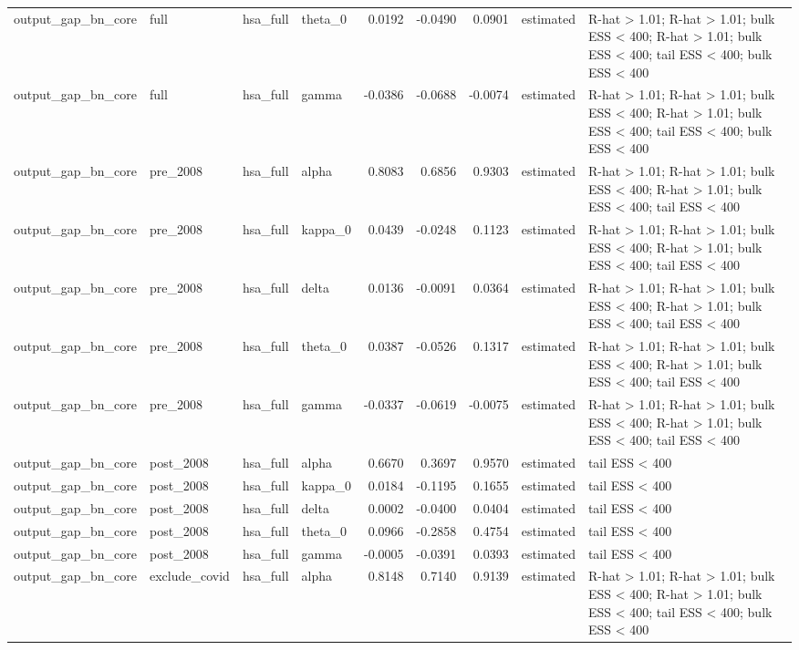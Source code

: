\begin{tabular}{llllrrrll}
output\_gap\_bn\_core & full & hsa\_full & theta\_0 & 0.0192 & -0.0490 & 0.0901 & estimated & R-hat > 1.01; R-hat > 1.01; bulk ESS < 400; R-hat > 1.01; bulk ESS < 400; tail ESS < 400; bulk ESS < 400 \\
output\_gap\_bn\_core & full & hsa\_full & gamma & -0.0386 & -0.0688 & -0.0074 & estimated & R-hat > 1.01; R-hat > 1.01; bulk ESS < 400; R-hat > 1.01; bulk ESS < 400; tail ESS < 400; bulk ESS < 400 \\
output\_gap\_bn\_core & pre\_2008 & hsa\_full & alpha & 0.8083 & 0.6856 & 0.9303 & estimated & R-hat > 1.01; R-hat > 1.01; bulk ESS < 400; R-hat > 1.01; bulk ESS < 400; tail ESS < 400 \\
output\_gap\_bn\_core & pre\_2008 & hsa\_full & kappa\_0 & 0.0439 & -0.0248 & 0.1123 & estimated & R-hat > 1.01; R-hat > 1.01; bulk ESS < 400; R-hat > 1.01; bulk ESS < 400; tail ESS < 400 \\
output\_gap\_bn\_core & pre\_2008 & hsa\_full & delta & 0.0136 & -0.0091 & 0.0364 & estimated & R-hat > 1.01; R-hat > 1.01; bulk ESS < 400; R-hat > 1.01; bulk ESS < 400; tail ESS < 400 \\
output\_gap\_bn\_core & pre\_2008 & hsa\_full & theta\_0 & 0.0387 & -0.0526 & 0.1317 & estimated & R-hat > 1.01; R-hat > 1.01; bulk ESS < 400; R-hat > 1.01; bulk ESS < 400; tail ESS < 400 \\
output\_gap\_bn\_core & pre\_2008 & hsa\_full & gamma & -0.0337 & -0.0619 & -0.0075 & estimated & R-hat > 1.01; R-hat > 1.01; bulk ESS < 400; R-hat > 1.01; bulk ESS < 400; tail ESS < 400 \\
output\_gap\_bn\_core & post\_2008 & hsa\_full & alpha & 0.6670 & 0.3697 & 0.9570 & estimated & tail ESS < 400 \\
output\_gap\_bn\_core & post\_2008 & hsa\_full & kappa\_0 & 0.0184 & -0.1195 & 0.1655 & estimated & tail ESS < 400 \\
output\_gap\_bn\_core & post\_2008 & hsa\_full & delta & 0.0002 & -0.0400 & 0.0404 & estimated & tail ESS < 400 \\
output\_gap\_bn\_core & post\_2008 & hsa\_full & theta\_0 & 0.0966 & -0.2858 & 0.4754 & estimated & tail ESS < 400 \\
output\_gap\_bn\_core & post\_2008 & hsa\_full & gamma & -0.0005 & -0.0391 & 0.0393 & estimated & tail ESS < 400 \\
output\_gap\_bn\_core & exclude\_covid & hsa\_full & alpha & 0.8148 & 0.7140 & 0.9139 & estimated & R-hat > 1.01; R-hat > 1.01; bulk ESS < 400; R-hat > 1.01; bulk ESS < 400; tail ESS < 400; bulk ESS < 400 \\

\end{tabular}
